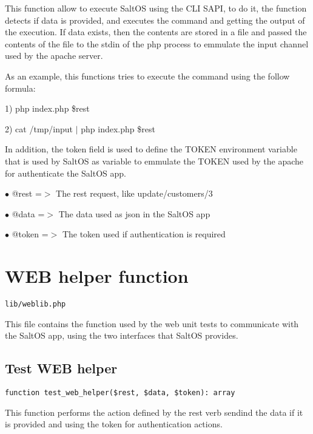 \documentclass[a4paper]{book}
\begin{document}
This function allow to execute SaltOS using the CLI SAPI, to do it, the function
detects if data is provided, and executes the command and getting the output of
the execution. If data exists, then the contents are stored in a file and passed
the contents of the file to the stdin of the php process to emmulate the input
channel used by the apache server.

As an example, this functions tries to execute the command using the follow formula:

1) php index.php \$rest

2) cat /tmp/input $|$ php index.php \$rest

In addition, the token field is used to define the TOKEN environment variable that
is used by SaltOS as variable to emmulate the TOKEN used by the apache for authenticate
the SaltOS app.

\begin{compactitem}
\item[\color{myblue}$\bullet$] @rest  =$>$ The rest request, like update/customers/3
\item[\color{myblue}$\bullet$] @data  =$>$ The data used as json in the SaltOS app
\item[\color{myblue}$\bullet$] @token =$>$ The token used if authentication is required
\end{compactitem}

\hypertarget{toc6}{}
\section{WEB helper function}

\begin{lstlisting}
lib/weblib.php
\end{lstlisting}

This file contains the function used by the web unit tests to communicate with the
SaltOS app, using the two interfaces that SaltOS provides.

\hypertarget{toc7}{}
\subsection{Test WEB helper}

\begin{lstlisting}
function test_web_helper($rest, $data, $token): array
\end{lstlisting}

This function performs the action defined by the rest verb sendind the data if it is
provided and using the token for authentication actions.
\end{document}
